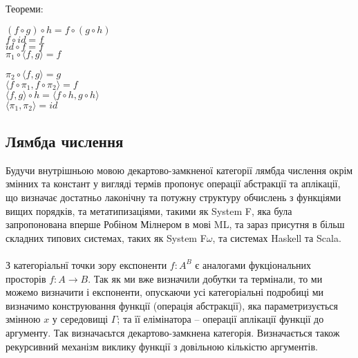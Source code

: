     Теореми:
\begin{fullwidth}[width=\linewidth+2cm]
\parbox[t][][l]{0.5\textwidth}{
$(f \circ g) \circ h = f \circ (g \circ h)$\\
$f \circ id = f$\\
$id \circ f = f$\\
$\pi_1 \circ \langle f, g \rangle = f$
}
\vspace{-1cm}
\parbox[t][][r]{0.4\textwidth}{
$\pi_2 \circ \langle f, g \rangle = g$\\
$\langle f \circ \pi_1, f \circ \pi_2 \rangle = f$\\
$\langle f, g \rangle \circ h = \langle f \circ h, g \circ h \rangle$\\
$\langle \pi_1, \pi_2 \rangle = id$
}
\end{fullwidth}

\newpage

    \subsection{Лямбда числення}
    Будучи внутрішньою мовою декартово-замкненої категорії лямбда числення окрім змінних
    та констант у вигляді термів пропонує операції абстракції та аплікації, що визначає
    достатньо лаконічну та потужну структуру обчислень з функціями вищих порядків,
    та метатипизаціями, такими як System F, яка була запропонована
    вперше Робіном Мілнером в мові ML, та зараз присутня в більш складних типових системах,
    таких як System F$\omega$, та системах Haskell та Scala.

    \paragraph{}
    З категоріальнї точки зору експоненти $f : A^B$ є аналогами
    фукціональних просторів $f: A \rightarrow B$.
    Так як ми вже визначили добутки та термінали, то ми можемо визначити і експоненти,
    опускаючи усі категоріальні подробиці ми визначимо конструювання функції (операція абстракції),
    яка параметризується змінною $x$ у середовищі $\Gamma$; та її елімінатора -- операції аплікації
    функції до аргументу. Так визначаєьтся декартово-замкнена категорія.
    Визначається також рекурсивний механізм виклику функції
    з довільною кількістю аргументів.



